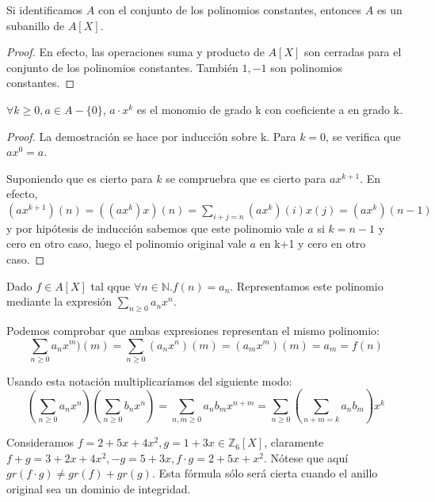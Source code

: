 \begin{proposition}
Si identificamos $A$ con el conjunto de los polinomios constantes, entonces $A$ es un subanillo de $A[X]$. 
\end{proposition}
\begin{proof}
En efecto, las operaciones suma y producto de $A[X]$ son cerradas para el conjunto de los polinomios constantes. También $1,-1$ son polinomios constantes. 
\end{proof}

\begin{lemma}
$\forall k \ge 0, a \in A - \{0\}$, $a \cdot x^k$ es el monomio de grado k con coeficiente a en grado k. 
\end{lemma}
\begin{proof}
La demostración se hace por inducción sobre k. Para $k = 0$, se verifica que $ax^0 = a$. 

Suponiendo que es cierto para $k$ se compruebra que es cierto para $ax^{k+1}$. En efecto, $(ax^{k+1})(n) = ((ax^k)x)(n) = \sum_{i+j = n} (ax^k)(i)x(j) = (ax^k)(n-1)$ y por hipótesis de inducción sabemos que este polinomio vale $a$ si $k = n-1$ y cero en otro caso, luego el polinomio original vale $a$ en k+1 y cero en otro caso. 
\end{proof}

\begin{definition}
Dado $f \in A[X]$ tal qque $\forall n \in \mathbb{N}. f(n) = a_n$. Representamos este polinomio mediante la expresión $\sum_{n \ge 0} a_nx^n$. 
\end{definition}

Podemos comprobar que ambas expresiones representan el mismo polinomio: $$\sum_{n \ge 0} a_n x^m)(m) = \sum_{n \ge 0} (a_n x^n)(m) = (a_mx^m)(m) = a_m = f(n)$$

Usando esta notación multiplicaríamos del siguiente modo: $$(\sum_{n \ge 0} a_n x^n)(\sum_{n \ge 0} b_n x^n) = \sum_{n,m \ge 0} a_n b_m x^{n+m} = \sum_{n \ge 0} (\sum_{n+m = k} a_nb_m) x^k$$ 

\begin{example}
Consideramos $f = 2+5x+4x^2, g = 1+3x \in \mathbb{Z}_6[X]$, claramente $f+g=3+2x+4x^2, -g = 5+3x,f\cdot g = 2 + 5x + x^2$. Nótese que aquí $gr(f \cdot g) \neq gr(f) + gr(g)$. Esta fórmula sólo será cierta cuando el anillo original sea un dominio de integridad. 
\end{example}

